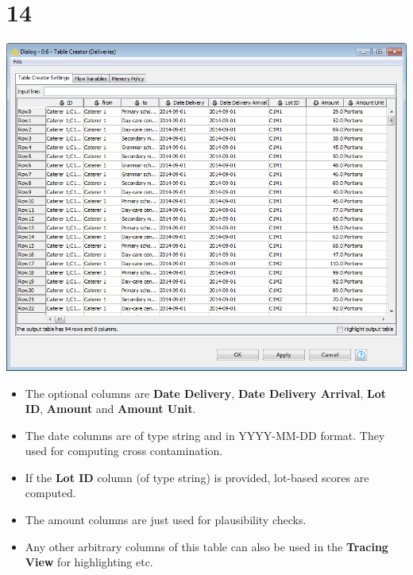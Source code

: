 \documentclass{beamer}
\begin{document}
\section{14}
\begin{frame}
	\begin{center}
  		\includegraphics[height=0.45\textheight]{14.png}
	\end{center}
	\begin{itemize}
		\item The optional columns are \textbf{Date Delivery}, \textbf{Date Delivery Arrival}, \textbf{Lot ID}, \textbf{Amount} and \textbf{Amount Unit}.
		\item The date columns are of type string and in YYYY-MM-DD format. They used for computing cross contamination.
		\item If the \textbf{Lot ID} column (of type string) is provided, lot-based scores are computed.
		\item The amount columns are just used for plausibility checks.
		\item Any other arbitrary columns of this table can also be used in the \textbf{Tracing View} for highlighting etc.
	\end{itemize}
\end{frame}
\end{document}
